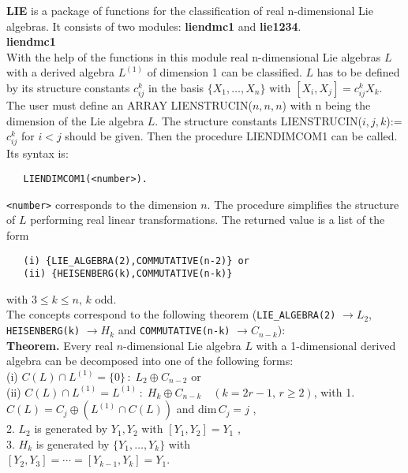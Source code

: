
{\bf LIE} is a package of functions for the classification of real n-dimensional
Lie algebras. It consists of two modules: {\bf liendmc1} and {\bf lie1234}.
\\[0.3cm]{\large\bf liendmc1}\\[0.1cm]
With the help of the functions in this module real n-dimensional Lie algebras
$L$ with a derived algebra $L^{(1)}$ of dimension 1 can be classified. $L$ has
to be defined by its structure constants $c_{ij}^k$ in the basis
$\{X_1,\ldots,X_n\}$ with $[X_i,X_j]=c_{ij}^k X_k$. The user must define an
ARRAY LIENSTRUCIN($n,n,n$) with n being the dimension of the Lie algebra $L$.
The structure constants LIENSTRUCIN($i,j,k$):=$c_{ij}^k$ for $i<j$ should be
given. Then the procedure LIENDIMCOM1 can be called. Its syntax is:
\begin{verbatim}
   LIENDIMCOM1(<number>).
\end{verbatim}
{\tt <number>} corresponds to the dimension $n$. The procedure simplifies
the structure of $L$ performing real linear transformations. The returned
value is a list of the form
\begin{verbatim}
   (i) {LIE_ALGEBRA(2),COMMUTATIVE(n-2)} or
   (ii) {HEISENBERG(k),COMMUTATIVE(n-k)}
\end{verbatim}
with $3\leq k\leq n$, $k$ odd.\\
The concepts correspond to the following theorem ({\tt LIE\_ALGEBRA(2)}
$\rightarrow L_2$, {\tt HEISENBERG(k)} $\rightarrow H_k$ and
{\tt COMMUTATIVE(n-k)} $\rightarrow C_{n-k}$):\\[0.2cm]
{\bf Theorem.} Every real $n$-dimensional Lie algebra $L$ with a 1-dimensional
derived algebra can be decomposed into one of the following forms:\\[0.1cm]
\hspace*{0.3cm} (i) $C(L)\cap L^{(1)}=\{0\}\, :\; L_2\oplus C_{n-2}$
or\\[0.05cm]
\hspace*{0.3cm} (ii) $C(L)\cap L^{(1)}=L^{(1)}\, :\; H_k\oplus C_{n-k}\quad
(k=2r-1,\, r\geq 2)$, with\newpage
\hspace*{0.3cm} 1. $C(L)=C_j\oplus (L^{(1)}\cap C(L))$
and dim$\,C_j=j$ ,\\[0.05cm]
\hspace*{0.3cm} 2. $L_2$ is generated by
$Y_1,Y_2$ with $[Y_1,Y_2]=Y_1$ ,\\[0.05cm]
\hspace*{0.3cm} 3. $H_k$ is generated by $\{Y_1,\ldots,Y_k\}$ with\\
\hspace*{0.7cm} $[Y_2,Y_3]=\cdots =[Y_{k-1},Y_k]=Y_1$.\\[0.2cm]
